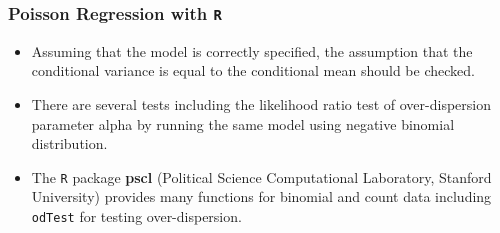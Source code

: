 \documentclass[MASTER.tex]{subfiles}
\begin{document}
\begin{frame}[fragile]
\frametitle{Poisson Regression with \texttt{R}}
	\Large
\begin{itemize}
\item Assuming that the model is correctly specified, the assumption that the conditional variance is equal 
to the conditional mean should be checked. 
\item There are several tests including the likelihood ratio test of over-dispersion parameter alpha by running the 
same model using negative binomial distribution. 
\item The \texttt{R} package \textbf{pscl} (Political Science Computational Laboratory, Stanford University) provides many functions for binomial 
and count data including \texttt{odTest} for testing over-dispersion. 
\end{itemize}
\end{frame}
\end{document}
